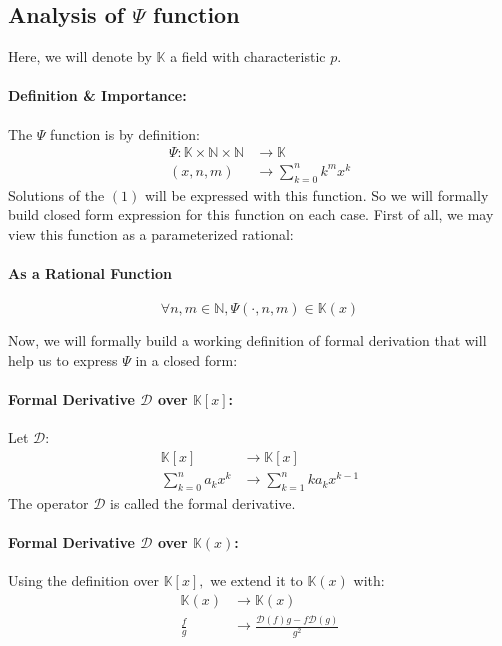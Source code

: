 \documentclass[]{article}
\begin{document}
\subsection{Analysis of $\Psi$ function}
Here, we will denote by $\mathbb{K}$ a field with characteristic $p.$
\newline
\paragraph{Definition \& Importance: } The $\Psi$ function is by definition:
\begin{align*}
	\Psi:\mathbb{K}\times \mathbb{N}\times \mathbb{N}&\rightarrow \mathbb{K}\\
	(x,n,m) & \rightarrow \sum_{k=0}^n k^mx^k
\end{align*}
Solutions of the $(1)$ will be expressed with this function. So we will formally build closed form expression for this function on each case.
\newline
First of all, we may view this function as a parameterized rational:
\paragraph{As a Rational Function}
$$
\forall n,m\in\mathbb{N}, \Psi(\cdot,n,m) \in\mathbb{K}(x)
$$

Now, we will formally build a working definition of formal derivation that will help us to express $\Psi$ in a closed form:
\paragraph{Formal Derivative $\mathcal{D}$ over $\mathbb{K}[x]$:}
Let $\mathcal{D}:$
\begin{align*}
	\mathbb{K}[x]&\rightarrow \mathbb{K}[x]\\
	\sum_{k=0}^n a_kx^k & \rightarrow \sum_{k=1}^n ka_kx^{k-1}
\end{align*}
The operator $\mathcal{D}$ is called the formal derivative.
\paragraph{Formal Derivative $\mathcal{D}$ over $\mathbb{K}(x)$:}
Using the definition over $\mathbb{K}[x],$ we extend it to $\mathbb{K}(x)$ with:
\begin{align*}
	\mathbb{K}(x)&\rightarrow \mathbb{K}(x)\\
	\frac{f}{g} & \rightarrow \frac{\mathcal{D}(f)g-f\mathcal{D}(g)}{g^2}
\end{align*}
\end{document}
